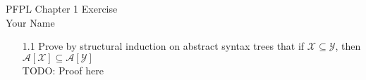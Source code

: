 \documentclass[12pt]{article}
\begin{document}
PFPL \hfill Chapter 1 Exercise\\
Your Name

\hrulefill

\begin{enumerate}
\item[1.1] Prove by structural induction on abstract syntax trees that if $\mathcal{X} \subseteq \mathcal{Y}$, then $\mathcal{A}[\mathcal{X}] \subseteq \mathcal{A}[\mathcal{Y}]$\\

TODO: Proof here


\end{enumerate}
\end{document}
